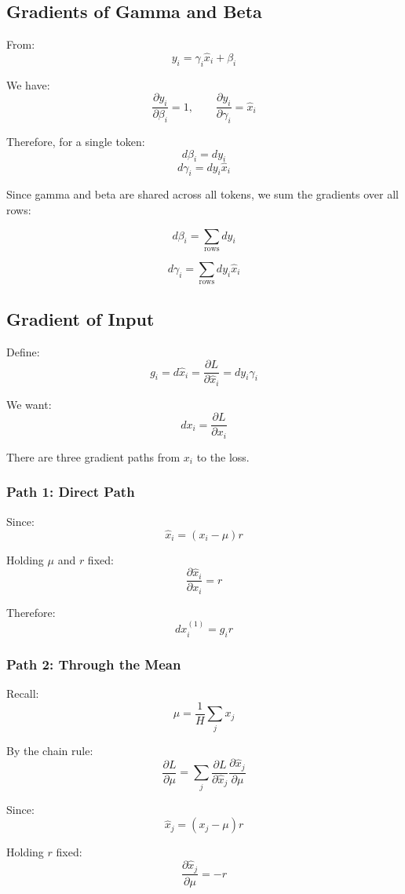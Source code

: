 \documentclass{article}
\begin{document}
\subsection{Gradients of Gamma and Beta}

From:
\[
y_i=\gamma_i\hat{x}_i+\beta_i
\]

We have:
\[
\frac{\partial y_i}{\partial\beta_i}=1,
\qquad
\frac{\partial y_i}{\partial\gamma_i}=\hat{x}_i
\]

Therefore, for a single token:
\[
d\beta_i=dy_i
\]
\[
d\gamma_i=dy_i\hat{x}_i
\]

Since gamma and beta are shared across all tokens,
we sum the gradients over all rows:

\[
\boxed{d\beta_i=\sum_{\text{rows}}dy_i}
\]

\[
\boxed{d\gamma_i=\sum_{\text{rows}}dy_i\hat{x}_i}
\]

\subsection{Gradient of Input}

Define:
\[
g_i=d\hat{x}_i
=\frac{\partial L}{\partial\hat{x}_i}
=dy_i\gamma_i
\]

We want:
\[
dx_i=\frac{\partial L}{\partial x_i}
\]

There are three gradient paths from $x_i$ to the loss.

\subsubsection{Path 1: Direct Path}

Since:
\[
\hat{x}_i=(x_i-\mu)r
\]

Holding $\mu$ and $r$ fixed:
\[
\frac{\partial\hat{x}_i}{\partial x_i}=r
\]

Therefore:
\[
\boxed{dx_i^{(1)}=g_i r}
\]

\subsubsection{Path 2: Through the Mean}

Recall:
\[
\mu=\frac{1}{H}\sum_j x_j
\]

By the chain rule:
\[
\frac{\partial L}{\partial\mu}
=
\sum_j
\frac{\partial L}{\partial\hat{x}_j}
\frac{\partial\hat{x}_j}{\partial\mu}
\]

Since:
\[
\hat{x}_j=(x_j-\mu)r
\]

Holding $r$ fixed:
\[
\frac{\partial\hat{x}_j}{\partial\mu}=-r
\]
\end{document}
